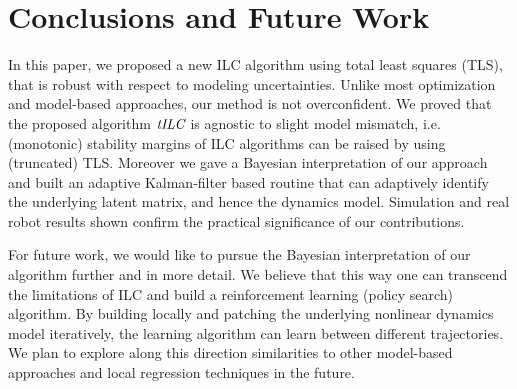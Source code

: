 \section{Conclusions and Future Work}\label{conclusions}

In this paper, we proposed a new ILC algorithm using total least squares (TLS), that is robust with respect to modeling uncertainties. Unlike most optimization and model-based approaches, our method is not overconfident. We proved that the proposed algorithm $\emph{tILC}$ is agnostic to slight model mismatch, i.e. (monotonic) stability margins of ILC algorithms can be raised by using (truncated) TLS. Moreover we gave a Bayesian interpretation of our approach and built an adaptive Kalman-filter based routine that can adaptively identify the underlying latent matrix, and hence the dynamics model. Simulation and real robot results shown confirm the practical significance of our contributions. %

For future work, we would like to pursue the Bayesian interpretation of our algorithm further and in more detail. We believe that this way one can transcend the limitations of ILC and build a reinforcement learning (policy search) algorithm. By building locally and patching the underlying nonlinear dynamics model iteratively, the learning algorithm can learn between different trajectories. We plan to explore along this direction similarities to other model-based approaches and local regression techniques in the future.
